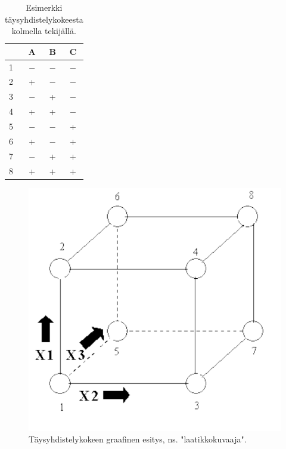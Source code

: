 \documentclass[12pt,a4paper,finnish]{tutthesis}
\begin{document}
\begin{table}[h]
  \begin{center}
  \caption{Esimerkki täysyhdistelykokeesta kolmella tekijällä.}
  \label{tab:fullf}
  \begin{tabular}{ | l | c | c | c | }
    \hline
     & \textbf{A} & \textbf{B} & \textbf{C} \\ \hline
    1 & $-$ & $-$ & $-$\\ \hline
    2 & + & $-$ & $-$\\ \hline
    3 & $-$ & + & $-$\\ \hline
    4 & + & + & $-$\\ \hline
    5 & $-$ & $-$ & +\\ \hline
    6 & + & $-$ & +\\ \hline
    7 & $-$ & + & +\\ \hline
    8 & + & + & +\\ \hline
  \end{tabular}
  \end{center}
\end{table}





\begin{figure}[h]
  \begin{center}
    \includegraphics[scale=0.6]{cube}
  \end{center}
  \caption[Laatikkokuvaaja]{Täysyhdistelykokeen graafinen esitys, ns. "laatikkokuvaaja".}
  \label{fig:cube}
\end{figure}
\end{document}
